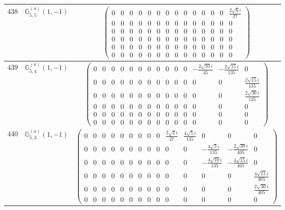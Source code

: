\documentclass[fleqn,8pt,landscape]{jsarticle}
\begin{document}
\begin{center}
\begin{longtable}{ccc}
$ 438 $ & $ \mathbb{G}_{5,5}^{(a)}(1,-1) $ & $ \begin{pmatrix} 0 & 0 & 0 & 0 & 0 & 0 & 0 & 0 & 0 & 0 & 0 & 0 & 0 & \frac{2 \sqrt{6} i}{27} \\ 0 & 0 & 0 & 0 & 0 & 0 & 0 & 0 & 0 & 0 & 0 & 0 & 0 & 0 \\ 0 & 0 & 0 & 0 & 0 & 0 & 0 & 0 & 0 & 0 & 0 & 0 & 0 & 0 \\ 0 & 0 & 0 & 0 & 0 & 0 & 0 & 0 & 0 & 0 & 0 & 0 & 0 & 0 \\ 0 & 0 & 0 & 0 & 0 & 0 & 0 & 0 & 0 & 0 & 0 & 0 & 0 & 0 \\ 0 & 0 & 0 & 0 & 0 & 0 & 0 & 0 & 0 & 0 & 0 & 0 & 0 & 0 \end{pmatrix} $ \\ \hline
$ 439 $ & $ \mathbb{G}_{5,4}^{(a)}(1,-1) $ & $ \begin{pmatrix} 0 & 0 & 0 & 0 & 0 & 0 & 0 & 0 & 0 & 0 & 0 & - \frac{2 \sqrt{10} i}{45} & - \frac{2 \sqrt{15} i}{135} & 0 \\ 0 & 0 & 0 & 0 & 0 & 0 & 0 & 0 & 0 & 0 & 0 & 0 & 0 & \frac{2 \sqrt{15} i}{135} \\ 0 & 0 & 0 & 0 & 0 & 0 & 0 & 0 & 0 & 0 & 0 & 0 & 0 & \frac{2 \sqrt{30} i}{135} \\ 0 & 0 & 0 & 0 & 0 & 0 & 0 & 0 & 0 & 0 & 0 & 0 & 0 & 0 \\ 0 & 0 & 0 & 0 & 0 & 0 & 0 & 0 & 0 & 0 & 0 & 0 & 0 & 0 \\ 0 & 0 & 0 & 0 & 0 & 0 & 0 & 0 & 0 & 0 & 0 & 0 & 0 & 0 \end{pmatrix} $ \\ \hline
$ 440 $ & $ \mathbb{G}_{5,3}^{(a)}(1,-1) $ & $ \begin{pmatrix} 0 & 0 & 0 & 0 & 0 & 0 & 0 & 0 & 0 & \frac{2 \sqrt{2} i}{27} & \frac{4 \sqrt{5} i}{135} & 0 & 0 & 0 \\ 0 & 0 & 0 & 0 & 0 & 0 & 0 & 0 & 0 & 0 & 0 & - \frac{4 \sqrt{5} i}{135} & - \frac{2 \sqrt{30} i}{405} & 0 \\ 0 & 0 & 0 & 0 & 0 & 0 & 0 & 0 & 0 & 0 & 0 & - \frac{4 \sqrt{10} i}{135} & - \frac{4 \sqrt{15} i}{405} & 0 \\ 0 & 0 & 0 & 0 & 0 & 0 & 0 & 0 & 0 & 0 & 0 & 0 & 0 & \frac{4 \sqrt{15} i}{405} \\ 0 & 0 & 0 & 0 & 0 & 0 & 0 & 0 & 0 & 0 & 0 & 0 & 0 & \frac{2 \sqrt{30} i}{405} \\ 0 & 0 & 0 & 0 & 0 & 0 & 0 & 0 & 0 & 0 & 0 & 0 & 0 & 0 \end{pmatrix} $ \\ \hline

\end{longtable}
\end{center}
\end{document}
